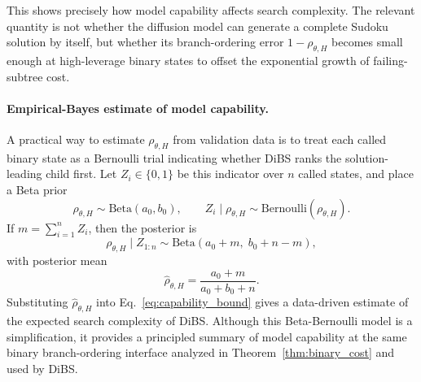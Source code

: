 \documentclass[lettersize,journal]{IEEEtran}
\begin{document}
This shows precisely how model capability affects search complexity.
The relevant quantity is not whether the diffusion model can generate a
complete Sudoku solution by itself, but whether its branch-ordering error
\(1-\rho_{\theta,H}\) becomes small enough at high-leverage binary states
to offset the exponential growth of failing-subtree cost.

\paragraph{Empirical-Bayes estimate of model capability.}
A practical way to estimate \(\rho_{\theta,H}\) from validation data is
to treat each called binary state as a Bernoulli trial indicating whether
DiBS ranks the solution-leading child first. Let \(Z_i\in\{0,1\}\) be
this indicator over \(n\) called states, and place a Beta prior
\[
\rho_{\theta,H}\sim \mathrm{Beta}(a_0,b_0),
\qquad
Z_i\mid \rho_{\theta,H}\sim \mathrm{Bernoulli}(\rho_{\theta,H}).
\]
If \(m=\sum_{i=1}^{n} Z_i\), then the posterior is
\[
\rho_{\theta,H}\mid Z_{1:n}
\sim
\mathrm{Beta}(a_0+m,\; b_0+n-m),
\]
with posterior mean
\begin{equation}
	\widehat{\rho}_{\theta,H}
	=
	\frac{a_0+m}{a_0+b_0+n}.
	\label{eq:beta_posterior_mean}
\end{equation}
Substituting \(\widehat{\rho}_{\theta,H}\) into
Eq.~\eqref{eq:capability_bound} gives a data-driven estimate of the
expected search complexity of DiBS. Although this Beta-Bernoulli model
is a simplification, it provides a principled summary of model capability
at the same binary branch-ordering interface analyzed in
Theorem~\ref{thm:binary_cost} and used by DiBS.








\vfill
\end{document}
